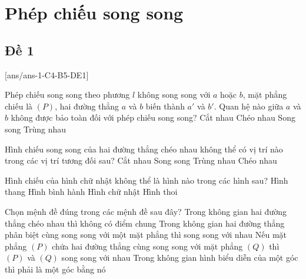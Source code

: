 \section{Phép chiếu song song}

\subsection{Đề 1}
[ans/ans-1-C4-B5-DE1]
\caulc
\begin{ex}%
Phép chiếu song song theo phương $l$ không song song với $a$ hoặc $b$, mặt phẳng chiếu là $(P)$, hai đường thẳng $a$ và $b$ biến thành $a'$ và $b'$. Quan hệ nào giữa $a$ và $b$ không được bảo toàn đối với phép chiếu song song?
\choice
{Cắt nhau}
{\True Chéo nhau}
{Song song}
{Trùng nhau}
\end{ex}

\begin{ex}%
Hình chiếu song song của hai đường thẳng chéo nhau không thể có vị trí nào trong các vị trí tương đối sau?
\choice
{Cắt nhau}
{Song song}
{Trùng nhau}
{\True Chéo nhau}
\end{ex}

\begin{ex}%
Hình chiếu của hình chữ nhật không thể là hình nào trong các hình sau?
\choice
{\True Hình thang}
{Hình bình hành}
{Hình chữ nhật}
{Hình thoi}
\end{ex}

\begin{ex}%
Chọn mệnh đề đúng trong các mệnh đề sau đây?
\choice
{\True Trong không gian hai đường thẳng chéo nhau thì không có điểm chung}
{Trong không gian hai đường thẳng phân biệt cùng song song với một mặt phẳng thì song song với nhau}
{Nếu mặt phẳng $(P)$ chứa hai đường thẳng cùng song song với mặt phẳng $(Q)$ thì $(P)$ và $(Q)$ song song với nhau}
{Trong không gian hình biểu diễn của một góc thì phải là một góc bằng nó}
\end{ex}

